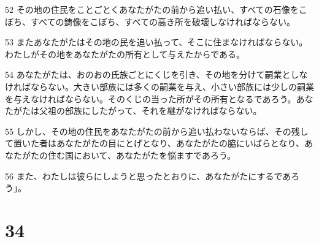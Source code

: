 \par 52 その地の住民をことごとくあなたがたの前から追い払い、すべての石像をこぼち、すべての鋳像をこぼち、すべての高き所を破壊しなければならない。
\par 53 またあなたがたはその地の民を追い払って、そこに住まなければならない。わたしがその地をあなたがたの所有として与えたからである。
\par 54 あなたがたは、おのおの氏族ごとにくじを引き、その地を分けて嗣業としなければならない。大きい部族には多くの嗣業を与え、小さい部族には少しの嗣業を与えなければならない。そのくじの当った所がその所有となるであろう。あなたがたは父祖の部族にしたがって、それを継がなければならない。
\par 55 しかし、その地の住民をあなたがたの前から追い払わないならば、その残して置いた者はあなたがたの目にとげとなり、あなたがたの脇にいばらとなり、あなたがたの住む国において、あなたがたを悩ますであろう。
\par 56 また、わたしは彼らにしようと思ったとおりに、あなたがたにするであろう」。

\chapter{34}

